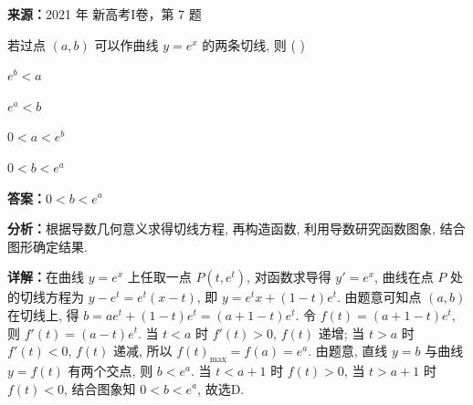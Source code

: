 \begin{question}[points=5]
\textbf{来源：}2021 年 新高考I卷，第 7 题\par
若过点 $(a,b)$ 可以作曲线 $y = e^x$ 的两条切线, 则 ( )
\begin{choices}
  \item $e^b < a$
  \item $e^a < b$
  \item $0 < a < e^b$
  \item $0 < b < e^a$
\end{choices}
\begin{solution}
\textbf{答案：}$0 < b < e^a$

\textbf{分析：}根据导数几何意义求得切线方程, 再构造函数, 利用导数研究函数图象, 结合图形确定结果.

\textbf{详解：}在曲线 $y = e^x$ 上任取一点 $P(t, e^t)$, 对函数求导得 $y' = e^x$, 曲线在点 $P$ 处的切线方程为 $y - e^t = e^t(x - t)$, 即 $y = e^t x + (1 - t)e^t$. 由题意可知点 $(a,b)$ 在切线上, 得 $b = ae^t + (1 - t)e^t = (a+1-t)e^t$. 令 $f(t) = (a+1-t)e^t$, 则 $f'(t) = (a - t)e^t$. 当 $t < a$ 时 $f'(t) > 0$, $f(t)$ 递增; 当 $t > a$ 时 $f'(t) < 0$, $f(t)$ 递减, 所以 $f(t)_{\max} = f(a) = e^a$. 由题意, 直线 $y = b$ 与曲线 $y = f(t)$ 有两个交点, 则 $b < e^a$. 当 $t < a+1$ 时 $f(t) > 0$, 当 $t > a+1$ 时 $f(t) < 0$, 结合图象知 $0 < b < e^a$, 故选D.
\end{solution}
\end{question}

